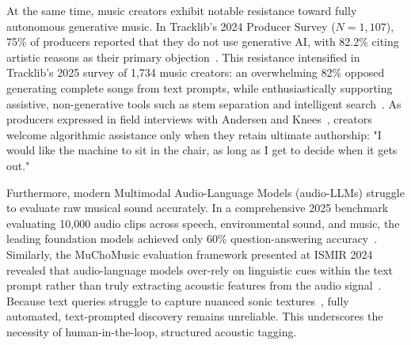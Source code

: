 At the same time, music creators exhibit notable resistance toward fully autonomous generative music. In Tracklib's 2024 Producer Survey ($N = 1,107$), 75\% of producers reported that they do not use generative AI, with 82.2\% citing artistic reasons as their primary objection~\cite{ref:mbw2024a_ai}. This resistance intensified in Tracklib's 2025 survey of 1,734 music creators: an overwhelming 82\% opposed generating complete songs from text prompts, while enthusiastically supporting assistive, non-generative tools such as stem separation and intelligent search~\cite{ref:musictech2025_tracklib}. As producers expressed in field interviews with Andersen and Knees~\cite{ref:andersen2016}, creators welcome algorithmic assistance only when they retain ultimate authorship: "I would like the machine to sit in the chair, as long as I get to decide when it gets out."

Furthermore, modern Multimodal Audio-Language Models (audio-LLMs) struggle to evaluate raw musical sound accurately. In a comprehensive 2025 benchmark evaluating 10,000 audio clips across speech, environmental sound, and music, the leading foundation models achieved only 60\% question-answering accuracy~\cite{ref:sakshi2025}. Similarly, the MuChoMusic evaluation framework presented at ISMIR 2024 revealed that audio-language models over-rely on linguistic cues within the text prompt rather than truly extracting acoustic features from the audio signal~\cite{ref:muchomusic2024}. Because text queries struggle to capture nuanced sonic textures~\cite{ref:zhang2019, ref:krekovic2019}, fully automated, text-prompted discovery remains unreliable. This underscores the necessity of human-in-the-loop, structured acoustic tagging.

